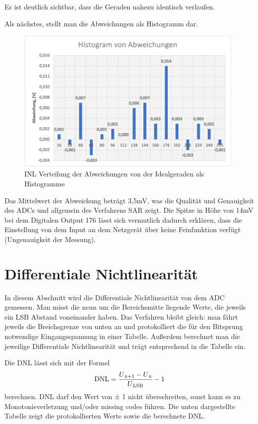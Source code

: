Es ist deutlich sichtbar, dass die Geraden nahezu identisch verlaufen.\par

Als nächstes, stellt man die Abweichungen als Histogramm dar. 

\begin{figure}[H]
	\centering
	\includegraphics[height=7cm]{images/Histogramm_versuch1.png} 
	\caption{INL Verteilung der Abweichungen von der
	Idealgeraden als Histogramme}
	\label{fig: INL Verteilung der Abweichungen von der
	Idealgeraden als Histogramme}
\end{figure}

Das Mittelwert der Abweichung beträgt 3,5mV, was die Qualität und Genauigkeit
des ADCs und allgemein des Verfahrens SAR zeigt.
Die Spitze in Höhe von 14mV bei dem Digitalen Output 176 lässt sich vermutlich 
dadurch erklären, dass die Einstellung von dem Input an dem Netzgerät über keine 
Feinfunktion verfügt (Ungenauigkeit der Messung).

\section{Differentiale Nichtlinearität}
In diesem Abschnitt wird die Differentiale Nichtlinearität von dem ADC gemessen.
Man misst die neun um die Bereichsmitte liegende Werte, die jeweils ein LSB Abstand
voneinander haben. Das Verfahren bleibt gleich: man fährt jeweils die Breichsgrenze 
von unten an und protokolliert die für den Bitsprung notwendige Eingangsspannung in 
einer Tabelle. Außerdem berechnet man die jeweilige Differentiale Nichtlinearität und
trägt entsprechend in die Tabelle ein.

Die DNL lässt sich mit der Formel 
\[
\text{DNL} = \frac{U\textsubscript{x+1} - U\textsubscript{x}}{U\textsubscript{LSB}} - 1
\]
berechnen. DNL darf den Wert von ± 1 nicht überschreiten, sonst kann es zu 
Monotonieverletzung und/oder missing codes führen. Die unten dargestellte Tabelle
zeigt die protokollierten Werte sowie die berechnete DNL.

